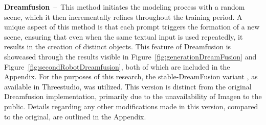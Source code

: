 \textbf{Dreamfusion}~--~This method initiates the modeling process with a random scene, which it then incrementally refines throughout the training period. A unique aspect of this method is that each prompt triggers the formation of a new scene, ensuring that even when the same textual input is used repeatedly, it results in the creation of distinct objects. This feature of Dreamfusion is showcased through the results visible in Figure~\ref{fig:generationDreamFusion} and Figure~\ref{fig:secondRobotDreamfusion}, both of which are included in the Appendix.
For the purposes of this research, the stable-DreamFusion variant \citep{stable-dreamfusion}, as available in Threestudio, was utilized. This version is distinct from the original Dreamfusion implementation, primarily due to the unavailability of Imagen to the public. Details regarding any other modifications made in this version, compared to the original, are outlined in the Appendix. 

